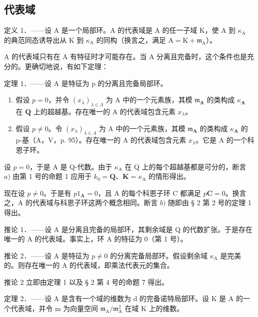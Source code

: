 \subsection{代表域}

定义 1．——设 A 是一个局部环。A 的代表域是 A 的任一子域 K，使 A 到 \(\kappa_{\mathrm{A}}\) 的典范同态诱导出从 K 到 \(\kappa_{\mathrm{A}}\) 的同构（换言之，满足 \(\mathrm{A} = \mathrm{K} + \mathfrak{m}_{\mathrm{A}}\)）。

A 的代表域只有在 A 有特征时才可能存在。当 A 分离且完备时，这个条件也是充分的。更确切地说，有如下定理：

定理 1．——设 A 是特征为 p 的分离且完备局部环。

\begin{enumerate}
\def\labelenumi{\alph{enumi})}
\item
  假设 \(p = 0\)，并令 \((x_{\lambda})_{\lambda \in \Lambda}\) 为 A 中的一个元素族，其模 \(\mathfrak{m}_{\mathbf{A}}\) 的类构成 \(\kappa_{\mathbf{A}}\) 在 \(\mathbf{Q}\) 上的超越基。存在唯一的 A 的代表域包含元素 \(x_{\lambda}\)。
\item
  假设 \(p \neq 0\)。令 \((x_{\lambda})_{\lambda \in \Lambda}\) 为 A 中的一个元素族，其模 \(\mathfrak{m}_{\mathbf{A}}\) 的类构成 \(\kappa_{\mathbf{A}}\) 的 p-基（A，V，p. 95）。存在唯一的 A 的代表域包含元素 \(x_{\lambda}\)。它是 A 的一个科恩子环。
\end{enumerate}

设 \(p = 0\)，于是 A 是 Q-代数。由于 \(\kappa_{\mathrm{A}}\) 在 Q 上的每个超越基都是可分的，断言 \(a)\) 由第 1 号的命题 1 应用于 \(k_0 = \mathbf{Q}\)、\(\mathbf{K} = \kappa_{\mathrm{A}}\) 的情形得出。

现在设 \(p \neq 0\)。于是有 \(p1_{\mathbf{A}} = 0\)，且 A 的每个科恩子环 C 都满足 \(p\mathbf{C} = 0\)。换言之，A 的代表域与科恩子环这两个概念相同。断言 \(b)\) 随即由 § 2 第 2 号的定理 1 得出。

推论 1．——设 A 是分离且完备的局部环，其剩余域是 Q 的代数扩张。于是存在唯一的 A 的代表域。事实上，环 A 的特征为 0（第 1 号）。

推论 2．——设 A 是特征为 \(p \neq 0\) 的分离完备局部环。假设剩余域 \(\kappa_{\mathrm{A}}\) 是完美的。则存在唯一的 A 的代表域，即乘法代表元的集合。

推论 2 立即由定理 1 以及 § 2 第 4 号的命题 7 得出。

定理 2．——设 A 是含有一个域的维数为 d 的完备诺特局部环。设 K 是 A 的一个代表域，并令 m 为向量空间 \(\mathfrak{m}_{\mathrm{A}} / \mathfrak{m}_{\mathrm{A}}^{2}\) 在域 K 上的维数。

